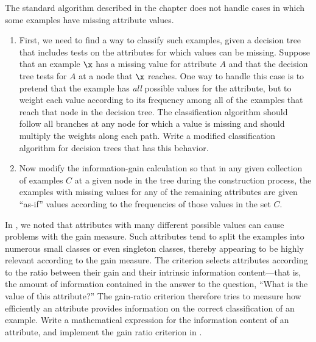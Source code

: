 \begin{exercise}%
\prgex
The standard  algorithm described in the
chapter does not handle cases in which some examples have missing
attribute values.
\begin{enumerate}
\item First, we need to find a way to classify such examples, given a
decision tree that includes tests on the attributes for which values
can be missing. Suppose that an example \(\x\) has a missing value for
attribute \(A\) and that the decision tree tests for \(A\) at a node that
\(\x\) reaches. One way to handle this case is to pretend that the
example has {\it all} possible values for the attribute, but to weight
each value according to its frequency among all of the examples that
reach that node in the decision tree. The classification algorithm
should follow all branches at any node for which a value is missing
and should multiply the weights along each path.
Write a modified classification algorithm for decision trees that has
this behavior.
\item Now modify the information-gain calculation so that in any given
collection of examples \(C\) at a given node in the tree during the
construction process, the examples with missing values for any of the
remaining attributes are given ``as-if'' values according to the
frequencies of those values in the set \(C\).
\end{enumerate}
\end{exercise} 

\begin{exercise}%
In , we noted that attributes with many different possible
values can cause problems with the gain measure. Such attributes tend
to split the examples into numerous small classes or even singleton classes,
thereby appearing to be highly relevant according to the gain measure.
The  criterion selects attributes according to the
ratio between their gain and their intrinsic information content---that is, the amount of information contained in the answer to the
question, ``What is the value of this attribute?'' The gain-ratio
criterion therefore tries to measure how efficiently an attribute
provides information on the correct classification of an example.
Write a mathematical expression for the information content of an
attribute, and implement the gain ratio criterion
in .
\end{exercise} 


